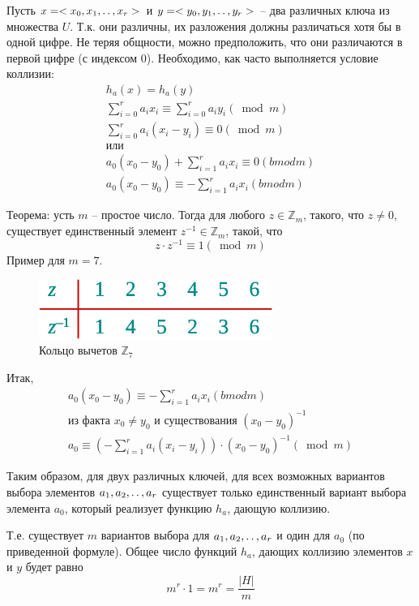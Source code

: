 \documentclass[11pt]{article}
\begin{document}
Пусть $x = <x_0, x_1, \mathinner{\ldotp\ldotp}, x_r>$ и $y = <y_0, y_1, \mathinner{\ldotp\ldotp}, y_r>$ -- два различных ключа из множества $U$. Т.к. они различны, их разложения должны различаться хотя бы в одной цифре. Не теряя общности, можно предположить, что они различаются в первой цифре (с индексом 0). Необходимо, как часто выполняется условие коллизии:
\begin{align*}
  h_a(x) = h_a(y) \\
  \sum_{i=0}^r a_i x_i \equiv \sum_{i=0}^r a_i y_i (\bmod m) \\
  \sum_{i=0}^r a_i(x_i - y_i) \equiv 0 (\bmod m) \\
  \text{или} \\
  a_0(x_0-y_0) + \sum_{i=1}^r a_i x_i \equiv 0 (bmod m) \\
  a_0(x_0-y_0) \equiv - \sum_{i=1}^r a_i x_i (bmod m)
\end{align*}

Теорема: усть $m$ -- простое число. Тогда для любого $z \in \mathbb{Z}_m$, такого, что $z \neq 0$, существует единственный элемент $z^{-1} \in \mathbb{Z}_m$, такой, что
\begin{equation*}
  z \cdot z^{-1} \equiv 1 (\bmod m)
\end{equation*}
Пример для $m = 7$.
\begin{figure}[ht]
  \centering
  \includegraphics[width=3in]{lecture8/z7.eps}
  \caption{Кольцо вычетов $\mathbb{Z}_7$}
  \label{fig:z7}
\end{figure}

Итак, 
\begin{align*}
  a_0(x_0-y_0) \equiv - \sum_{i=1}^r a_i x_i (bmod m) \\
  \text{из факта } x_0 \neq y_0 \text{ и существования } (x_0 - y_0)^{-1} \\
  a_0 \equiv \left(-\sum_{i=1}^{r} a_i(x_i - y_i)\right)\cdot(x_0-y_0)^{-1} (\bmod m)
\end{align*}

Таким образом, для двух различных ключей, для всех возможных вариантов выбора элементов $a_1, a_2, \mathinner{\ldotp\ldotp}, a_r$ существует только единственный вариант выбора элемента $a_0$, который реализует функцию $h_a$, дающую коллизию.

Т.е. существует $m$ вариантов выбора для $a_1, a_2, \mathinner{\ldotp\ldotp}, a_r$ и один для $a_0$ (по приведенной формуле). Общее число функций $h_a$, дающих коллизию элементов $x$ и $y$ будет равно
\begin{equation*}
  m^r\cdot1 = m^r = \frac{|H|}{m}
\end{equation*}
\end{document}
